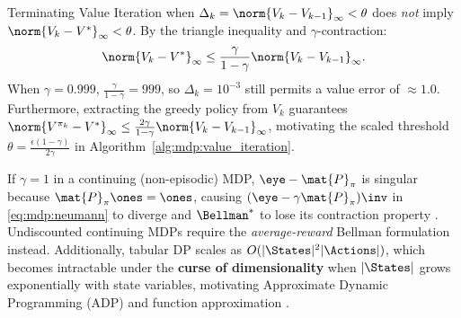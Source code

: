 \documentclass[../../../../master.tex]{subfiles}
\begin{document}
\begin{pitfall}
Terminating Value Iteration when $\Delta_k = \norm{V_k - V_{k-1}}_\infty < \theta$ does \emph{not} imply $\norm{V_k - V^*}_\infty < \theta$. By the triangle inequality and $\gamma$-contraction:
\begin{equation}\label{eq:mdp:vi_bound}
  \norm{V_k - V^*}_\infty \le \frac{\gamma}{1 - \gamma} \norm{V_k - V_{k-1}}_\infty.
\end{equation}
When $\gamma = 0.999$, $\frac{\gamma}{1-\gamma} = 999$, so $\Delta_k = 10^{-3}$ still permits a value error of $\approx 1.0$. Furthermore, extracting the greedy policy from $V_k$ guarantees $\norm{V^{\pi_k} - V^*}_\infty \le \frac{2\gamma}{1-\gamma}\norm{V_k - V_{k-1}}_\infty$, motivating the scaled threshold $\theta = \frac{\epsilon(1-\gamma)}{2\gamma}$ in Algorithm~\ref{alg:mdp:value_iteration}.
\end{pitfall}

\begin{pitfall}[Singularity for $\gamma = 1$ in Continuing Tasks and Curse of Dimensionality]
If $\gamma = 1$ in a continuing (non-episodic) MDP, $\eye - \mat{P}_\pi$ is singular because $\mat{P}_\pi \ones = \ones$, causing $(\eye - \gamma \mat{P}_\pi)\inv$ in \eqref{eq:mdp:neumann} to diverge and $\Bellman^*$ to lose its contraction property . Undiscounted continuing MDPs require the \emph{average-reward} Bellman formulation instead. Additionally, tabular DP scales as $O(|\States|^2 |\Actions|)$, which becomes intractable under the \textbf{curse of dimensionality} when $|\States|$ grows exponentially with state variables, motivating Approximate Dynamic Programming (ADP) and function approximation .
\end{pitfall}
\end{document}
